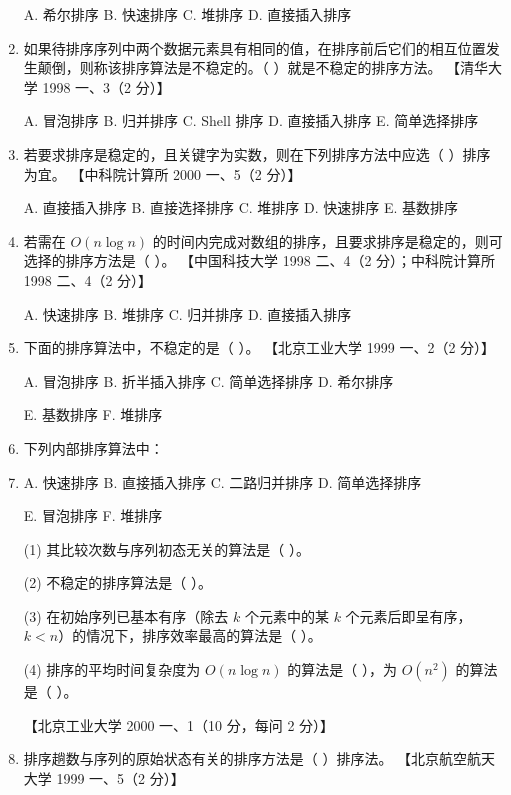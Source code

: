 \documentclass[lang=cn,newtx,10pt,scheme=chinese]{elegantbook}
\begin{document}
\begin{enumerate}
    A. 希尔排序 \quad B. 快速排序 \quad C. 堆排序 \quad D. 直接插入排序  

    \item 如果待排序序列中两个数据元素具有相同的值，在排序前后它们的相互位置发生颠倒，则称该排序算法是不稳定的。（ ）就是不稳定的排序方法。  
    【清华大学 1998 一、3（2 分）】  

    A. 冒泡排序 \quad B. 归并排序 \quad C. Shell 排序 \quad D. 直接插入排序 \quad E. 简单选择排序  

    \item 若要求排序是稳定的，且关键字为实数，则在下列排序方法中应选（ ）排序为宜。  
    【中科院计算所 2000 一、5（2 分）】  

    A. 直接插入排序 \quad B. 直接选择排序 \quad C. 堆排序 \quad D. 快速排序 \quad E. 基数排序  

    \item 若需在 $O(n \log n)$ 的时间内完成对数组的排序，且要求排序是稳定的，则可选择的排序方法是（ ）。  
    【中国科技大学 1998 二、4（2 分）；中科院计算所 1998 二、4（2 分）】  

    A. 快速排序 \quad B. 堆排序 \quad C. 归并排序 \quad D. 直接插入排序  

    \item 下面的排序算法中，不稳定的是（ ）。  
    【北京工业大学 1999 一、2（2 分）】  

    A. 冒泡排序 \quad B. 折半插入排序 \quad C. 简单选择排序 \quad D. 希尔排序  

    E. 基数排序 \quad F. 堆排序  

    \item 下列内部排序算法中：  
    \item 
    A. 快速排序 \quad B. 直接插入排序 \quad C. 二路归并排序 \quad D. 简单选择排序  

    E. 冒泡排序 \quad F. 堆排序  

    (1) 其比较次数与序列初态无关的算法是（ ）。 

    (2) 不稳定的排序算法是（ ）。  

    (3) 在初始序列已基本有序（除去 $k$ 个元素中的某 $k$ 个元素后即呈有序，$k < n$）的情况下，排序效率最高的算法是（ ）。  

    (4) 排序的平均时间复杂度为 $O(n \log n)$ 的算法是（ ），为 $O(n^2)$ 的算法是（ ）。  

    【北京工业大学 2000 一、1（10 分，每问 2 分）】  

    \item 排序趟数与序列的原始状态有关的排序方法是（ ）排序法。  
    【北京航空航天大学 1999 一、5（2 分）】  


\end{enumerate}
\end{document}

